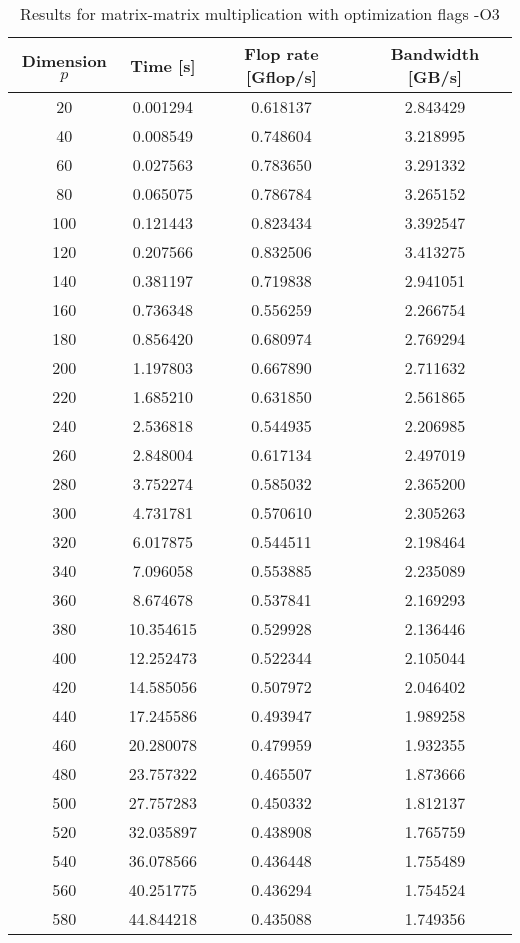 \documentclass[10pt,a4paper]{article}
\theoremstyle{dotlessP}
\begin{document}
	\begin{table}[tbhp] 
	{\footnotesize
		\caption{Results for matrix-matrix multiplication with optimization flags -O3
		}\label{tab:mm3}
		\begin{center}
			\begin{tabular}{cccc}
				\hline 
 Dimension  $p$ &    Time [s] &  Flop rate [Gflop/s]     & Bandwidth  [GB/s] \\ 
 \hline 
20 &   0.001294 &    0.618137 &   2.843429 \\ 
40 &   0.008549 &    0.748604 &   3.218995 \\ 
60 &   0.027563 &    0.783650 &   3.291332 \\ 
80 &   0.065075 &    0.786784 &   3.265152 \\ 
100 &   0.121443 &    0.823434 &   3.392547 \\ 
120 &   0.207566 &    0.832506 &   3.413275 \\ 
140 &   0.381197 &    0.719838 &   2.941051 \\ 
160 &   0.736348 &    0.556259 &   2.266754 \\ 
180 &   0.856420 &    0.680974 &   2.769294 \\ 
200 &   1.197803 &    0.667890 &   2.711632 \\ 
220 &   1.685210 &    0.631850 &   2.561865 \\ 
240 &   2.536818 &    0.544935 &   2.206985 \\ 
260 &   2.848004 &    0.617134 &   2.497019 \\ 
280 &   3.752274 &    0.585032 &   2.365200 \\ 
300 &   4.731781 &    0.570610 &   2.305263 \\ 
320 &   6.017875 &    0.544511 &   2.198464 \\ 
340 &   7.096058 &    0.553885 &   2.235089 \\ 
360 &   8.674678 &    0.537841 &   2.169293 \\ 
380 &  10.354615 &    0.529928 &   2.136446 \\ 
400 &  12.252473 &    0.522344 &   2.105044 \\ 
420 &  14.585056 &    0.507972 &   2.046402 \\ 
440 &  17.245586 &    0.493947 &   1.989258 \\ 
460 &  20.280078 &    0.479959 &   1.932355 \\ 
480 &  23.757322 &    0.465507 &   1.873666 \\ 
500 &  27.757283 &    0.450332 &   1.812137 \\ 
520 &  32.035897 &    0.438908 &   1.765759 \\ 
540 &  36.078566 &    0.436448 &   1.755489 \\ 
560 &  40.251775 &    0.436294 &   1.754524 \\ 
580 &  44.844218 &    0.435088 &   1.749356 \\
				\hline 
			\end{tabular} 
		\end{center}
	}
\end{table}
\end{document}
